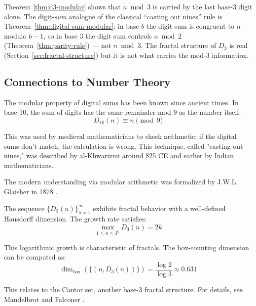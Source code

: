 \begin{remark}
Theorem \ref{thm:d3-modular} shows that $n \bmod 3$ is carried by the last
base-3 digit alone. The digit-\emph{sum} analogue of the classical ``casting out
nines'' rule is Theorem~\ref{thm:digital-sum-modular}: in base $b$ the digit sum
is congruent to $n$ modulo $b-1$, so in base 3 the digit sum controls
$n \bmod 2$ (Theorem~\ref{thm:parity-rule}) --- not $n \bmod 3$. The fractal
structure of $D_3$ is real (Section~\ref{sec:fractal-structure}) but it is not
what carries the mod-3 information.
\end{remark}


\subsection{Connections to Number Theory}
\label{subsec:connections-number-theory}

\begin{historicalnote}
The modular property of digital sums has been known since ancient times. In base-10, the sum of digits has the same remainder mod 9 as the number itself:
$$D_{10}(n) \equiv n \pmod{9}$$

This was used by medieval mathematicians to check arithmetic: if the digital sums don't match, the calculation is wrong. This technique, called "casting out nines," was described by al-Khwarizmi around 825 CE and earlier by Indian mathematicians.

The modern understanding via modular arithmetic was formalized by J.W.L. Glaisher in 1878 \cite{glaisher1878}.
\end{historicalnote}

\begin{advanced}
The sequence $\{D_3(n)\}_{n=1}^{\infty}$ exhibits fractal behavior with a well-defined Hausdorff dimension. The growth rate satisfies:
$$\max_{1 \leq n \leq 3^k} D_3(n) = 2k$$

This logarithmic growth is characteristic of fractals. The box-counting dimension can be computed as:
$$\dim_{\text{box}}(\{(n, D_3(n))\}) = \frac{\log 2}{\log 3} \approx 0.631$$

This relates to the Cantor set, another base-3 fractal structure. For details, see Mandelbrot \cite{mandelbrot1982} and Falconer \cite{falconer2004}.
\end{advanced}

